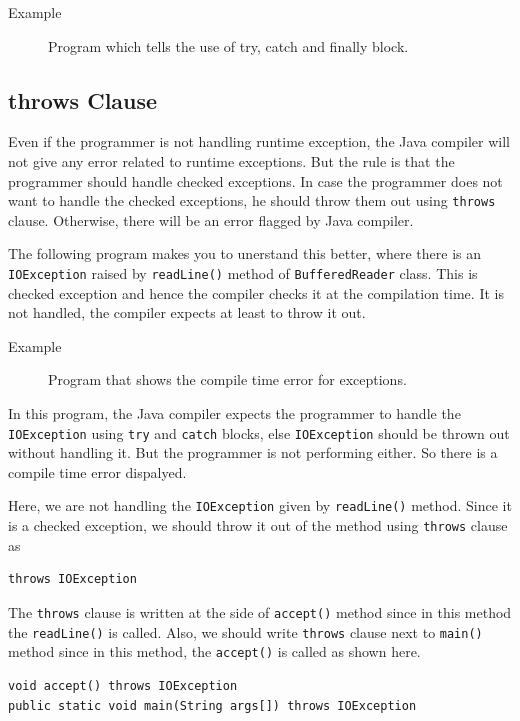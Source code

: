 \documentclass[11pt,a4paper]{article}
\begin{document}
\begin{description}
\item[Example] Program which tells the use of try, catch and finally block.


\end{description}
\subsection*{throws Clause}
Even if the programmer is not handling runtime exception, the Java compiler will not give any error related to runtime exceptions. But the rule is that the programmer should handle checked exceptions. In case the programmer does not want to handle the checked exceptions, he should throw them out using \texttt{throws} clause. Otherwise, there will be an error flagged by Java compiler. 

The following program makes you to unerstand this better, where there is an \texttt{IOException} raised by \texttt{readLine()} method of \texttt{BufferedReader} class. This is checked exception and hence the compiler checks it at the compilation time. It is not handled, the compiler expects at least to throw it out.
\begin{description}
\item[Example] Program that shows the compile time error for exceptions.


\end{description} 
In this program, the Java compiler expects the programmer to handle the \texttt{IOException} using \texttt{try} and \texttt{catch} blocks, else \texttt{IOException} should be thrown out without handling it. But the programmer is not performing either. So there is a compile time error dispalyed.

Here, we are not handling the \texttt{IOException} given by \texttt{readLine()} method. Since it is a checked exception, we should throw it out of the method using \texttt{throws} clause as
\begin{lstlisting}[numbers=none]
throws IOException
\end{lstlisting}

The \texttt{throws} clause is written at the side of \texttt{accept()} method since in this method the \texttt{readLine()} is called. Also, we should write \texttt{throws} clause next to \texttt{main()} method since in this method, the \texttt{accept()} is called as shown here.
\begin{lstlisting}[numbers=none]
void accept() throws IOException
public static void main(String args[]) throws IOException
\end{lstlisting}
\end{document}
